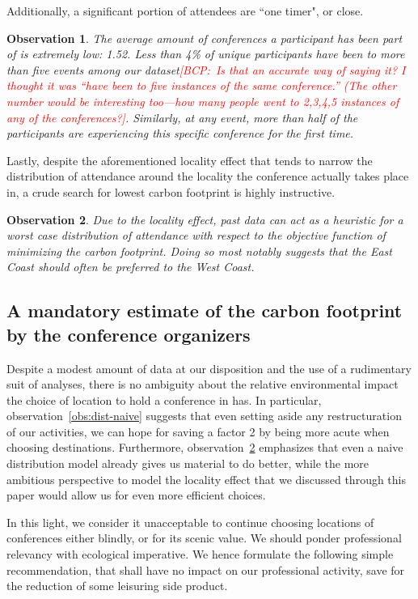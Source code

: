 \documentclass[manuscript, review, screen]{acmart}
\newcommand{\bcp}[1]{\textcolor{red}{{[BCP:~#1]}}}
\newcommand{\bcp}[1]{}
\newcommand{\event}{event} %
\newtheorem{obs}{Observation}
\begin{document}
Additionally, a significant portion of attendees are ``one timer", or close.

\begin{obs}
  The average amount of conferences a participant has been part of is extremely low: 1.52.
  Less than 4\% of unique participants have been to more than five events
  among our dataset\bcp{Is that an accurate way of saying it?  I thought it
    was ``have been to five instances of the same conference.''  (The other
    number would be interesting too---how many people went to 2,3,4,5
    instances of {\em any} of the conferences?}.
  Similarly, at any \event, more than half of the participants are experiencing this specific
  conference for the first time.
  \label{obs:old-timers}
\end{obs}

Lastly, despite the aforementioned locality effect that tends to narrow the
distribution of attendance around the locality the conference actually takes
place in, a crude search for lowest carbon footprint is highly instructive.

\begin{obs}
  Due to the locality effect, past data can act as a heuristic for a worst case
  distribution of attendance with respect to the objective function of
  minimizing the carbon footprint. Doing so most notably suggests that the East
  Coast should often be preferred to the West Coast.
  \label{obs:optim}
\end{obs}

\subsection{A mandatory estimate of the carbon footprint by the conference organizers}

Despite a modest amount of data at our disposition and the use of a rudimentary suit of
analyses, there is no ambiguity about the relative environmental impact the choice of
location to hold a conference in has. In particular, observation~\ref{obs:dist-naive}
suggests that even setting aside any restructuration of our activities, we can hope for
saving a factor 2 by being more acute when choosing destinations. Furthermore,
observation~\ref{obs:optim} emphasizes that even a naive distribution model already gives
us material to do better, while the more ambitious perspective to model the locality effect
that we discussed through this paper would allow us for even more efficient choices.

In this light, we consider it unacceptable to continue choosing locations of conferences
either blindly, or for its scenic value. We should ponder professional relevancy with
ecological imperative. We hence formulate the following simple recommendation, that shall
have no impact on our professional activity, save for the reduction of some leisuring side
product.
\end{document}
